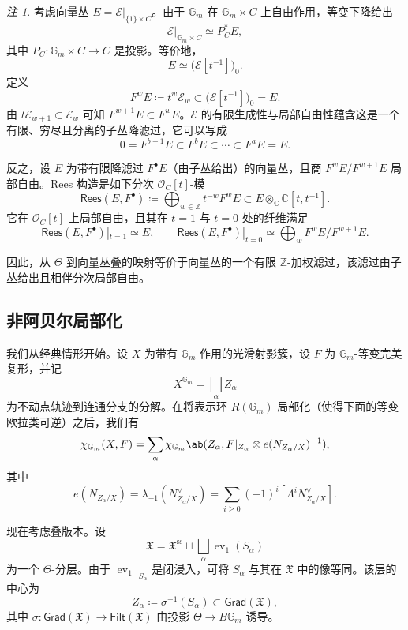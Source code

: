 \documentclass{amsart}
\theoremstyle{definition}
\theoremstyle{remark}
\newtheorem{rmk}[thm]{注}
\theoremstyle{plain}
\theoremstyle{definition}
\theoremstyle{remark}
\newcommand{\G}{\mathbb{G}}
\newcommand{\C}{\mathbb{C}}
\newcommand{\Z}{\mathbb{Z}}
\newcommand{\mc}[1]{\mathcal{#1}}
\newcommand{\mf}[1]{\mathfrak{#1}}
\newcommand{\mr}[1]{\mathrm{#1}}
\newcommand{\ms}[1]{\mathsf{#1}}
\newcommand{\1}{\mathbf{1}}
\newcommand{\2}{\mathbf{2}}
\newcommand{\3}{\mathbf{3}}
\DeclareMathOperator{\ev}{ev}
\begin{document}
\begin{rmk}
    考虑向量丛 \(E=\mc{E}|_{\{1\}\times C}\)。由于 \(\G_m\) 在 \(\G_m\times C\) 上自由作用，等变下降给出
    \[
        \mc{E}|_{\G_m\times C}\simeq P_C^*E,
    \]
    其中 \(P_C\colon\G_m\times C\to C\) 是投影。等价地，
    \[
        E\simeq\big(\mc{E}[t^{-1}]\big)_0.
    \]
    定义
    \[
        F^wE\coloneqq t^w\mc{E}_w\subset\big(\mc{E}[t^{-1}]\big)_0=E.
    \]
    由 \(t\mc{E}_{w+1}\subset\mc{E}_w\) 可知 \(F^{w+1}E\subset F^wE\)。\(\mc{E}\) 的有限生成性与局部自由性蕴含这是一个有限、穷尽且分离的子丛降滤过，它可以写成
    \[
        0=F^{b+1}E\subset F^bE\subset\cdots\subset F^aE=E.
    \]

    反之，设 \(E\) 为带有限降滤过 \(F^\bullet E\)（由子丛给出）的向量丛，且商 \(F^wE/F^{w+1}E\) 局部自由。Rees 构造是如下分次 \(\mc{O}_C[t]\)-模
    \[
        \ms{Rees}(E,F^\bullet)
        \coloneqq
        \bigoplus_{w\in\Z}t^{-w}F^wE
        \subset
        E\otimes_{\C}\C[t,t^{-1}].
    \]
    它在 \(\mc{O}_C[t]\) 上局部自由，且其在 \(t=1\) 与 \(t=0\) 处的纤维满足
    \[
        \ms{Rees}(E,F^\bullet)|_{t=1}\simeq E,
        \qquad
        \ms{Rees}(E,F^\bullet)|_{t=0}
        \simeq
        \bigoplus_w F^wE/F^{w+1}E.
    \]
\end{rmk}

因此，从 \(\Theta\) 到向量丛叠的映射等价于向量丛的一个有限 \(\Z\)-加权滤过，该滤过由子丛给出且相伴分次局部自由。


\subsection{非阿贝尔局部化}%
\label{sub:Non-abelian localization}

我们从经典情形开始。设 \(X\) 为带有 \(\G_m\) 作用的光滑射影簇，设 \(F\) 为 \(\G_m\)-等变完美复形，并记
\[
    X^{\G_m}=\bigsqcup_\alpha Z_\alpha
\]
为不动点轨迹到连通分支的分解。在将表示环 \(R(\G_m)\) 局部化（使得下面的等变欧拉类可逆）之后，我们有
\[
    \chi_{\G_m}(X,F)
    =
    \sum_\alpha
    \chi_{\G_m}\ab(
        Z_\alpha,
        F|_{Z_\alpha}\otimes e(N_{Z_\alpha/X})^{-1}
    ),
\]
其中
\[
    e(N_{Z_\alpha/X})
    =
    \lambda_{-1}(N_{Z_\alpha/X}^\vee)
    =
    \sum_{i\geq0}(-1)^i[\Lambda^iN_{Z_\alpha/X}^\vee].
\]

现在考虑叠版本。设
\[
    \mf{X}
    =
    \mf{X}^{\mr{ss}}
    \sqcup
    \bigsqcup_\alpha\ev_1(S_\alpha)
\]
为一个 \(\Theta\)-分层。由于 \(\ev_1|_{S_\alpha}\) 是闭浸入，可将 \(S_\alpha\) 与其在 \(\mf{X}\) 中的像等同。该层的中心为
\[
    Z_\alpha\coloneqq\sigma^{-1}(S_\alpha)\subset\ms{Grad}(\mf{X}),
\]
其中 \(\sigma\colon\ms{Grad}(\mf{X})\to\ms{Filt}(\mf{X})\) 由投影 \(\Theta\to B\G_m\) 诱导。
\end{document}
